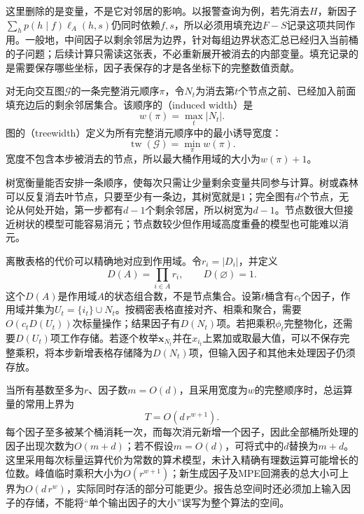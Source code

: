 这里删除的是变量，不是它对邻居的影响。以报警查询为例，若先消去$H$，新因子$\sum_h p(h\mid f)\ell_A(h,s)$仍同时依赖$f,s$，所以必须用填充边$F-S$记录这项共同作用。一般地，中间因子以剩余邻居为边界，针对每组边界状态汇总已经归入当前桶的子问题；后续计算只需读这张表，不必重新展开被消去的内部变量。填充记录的是需要保存哪些坐标，因子表保存的才是各坐标下的完整数值贡献。

\begin{definition}[诱导宽度与树宽]
  \label{def:pgm-elimination-treewidth}
  对无向交互图$\mathcal{G}$的一条完整消元顺序$\pi$，令$N_t$为消去第$t$个节点之前、已经加入前面填充边后的剩余邻居集合。该顺序的（induced width）是
  \[
    w(\pi)=\max_t|N_t|.
  \]
  图的（treewidth）定义为所有完整消元顺序中的最小诱导宽度：
  \[
    \operatorname{tw}(\mathcal{G})=\min_\pi w(\pi).
  \]
  宽度不包含本步被消去的节点，所以最大桶作用域的大小为$w(\pi)+1$。
\end{definition}

树宽衡量能否安排一条顺序，使每次只需让少量剩余变量共同参与计算。树或森林可以反复消去叶节点，只要至少有一条边，其树宽就是$1$；完全图有$d$个节点，无论从何处开始，第一步都有$d-1$个剩余邻居，所以树宽为$d-1$。节点数很大但接近树状的模型可能容易消元；节点数较少但作用域高度重叠的模型也可能难以消元。

离散表格的代价可以精确地对应到作用域。令$r_i=|D_i|$，并定义
\[
  D(A)=\prod_{i\in A}r_i,\qquad D(\varnothing)=1.
\]
这个$D(A)$是作用域$A$的状态组合数，不是节点集合。设第$t$桶含有$c_t$个因子，作用域并集为$U_t=\{i_t\}\cup N_t$。按稠密表格直接对齐、相乘和聚合，需要$O(c_tD(U_t))$次标量操作；结果因子有$D(N_t)$项。若把乘积$\phi_t$完整物化，还需要$D(U_t)$项工作存储。若逐个枚举$\bm{x}_{N_t}$并在$x_{i_t}$上累加或取最大值，可以不保存完整乘积，将本步新增表格存储降为$D(N_t)$项，但输入因子和其他未处理因子仍须存放。

当所有基数至多为$r$、因子数$m=O(d)$，且采用宽度为$w$的完整顺序时，总运算量的常用上界为
\begin{equation}
  T=O(d\,r^{w+1}).
  \label{eq:pgm-elimination-discrete-time}
\end{equation}
每个因子至多被某个桶消耗一次，而每次消元新增一个因子，因此全部桶所处理的因子出现次数为$O(m+d)$；若不假设$m=O(d)$，可将式中的$d$替换为$m+d$。这里采用每次标量运算代价为常数的算术模型，未计入精确有理数运算可能增长的位数。峰值临时乘积大小为$O(r^{w+1})$；新生成因子及MPE回溯表的总大小可上界为$O(d\,r^w)$，实际同时存活的部分可能更少。报告总空间时还必须加上输入因子的存储，不能将“单个输出因子的大小”误写为整个算法的空间。

